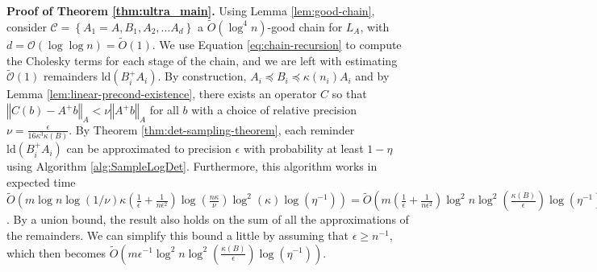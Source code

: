 \textbf{Proof of Theorem \ref{thm:ultra_main}.} Using Lemma \ref{lem:good-chain},
consider $\mathcal{C}=\left\{ A_{1}=A,B_{1},A_{2},\dots A_{d}\right\} $
a $\tilde{O}\left(\log^{4}n\right)$-good chain for $L_{A}$, with
$d=\mathcal{O}\left(\log\log n\right)=\tilde{O}\left(1\right)$. We
use Equation \ref{eq:chain-recursion} to compute the Cholesky terms
for each stage of the chain, and we are left with estimating $\tilde{\mathcal{O}}\left(1\right)$
remainders $\text{ld}\left(B_{i}^{+}A_{i}\right)$. By construction,
$A_{i}\preceq B_{i}\preceq\kappa\left(n_{i}\right)A_{i}$ and by Lemma
\ref{lem:linear-precond-existence}, there exists an operator $C$
so that $\left\Vert C\left(b\right)-A^{+}b\right\Vert _{A}<\nu\left\Vert A^{+}b\right\Vert _{A}$
for all $b$ with a choice of relative precision $\nu=\frac{\epsilon}{16\kappa^{3}\kappa\left(B\right)}$.
By Theorem \ref{thm:det-sampling-theorem}, each reminder $\text{ld}\left(B_{i}^{+}A_{i}\right)$
can be approximated to precision $\epsilon$ with probability at least
$1-\eta$ using Algorithm \ref{alg:SampleLogDet}. Furthermore, this
algorithm works in expected time $\tilde{O}\left(m\log n\log\left(1/\nu\right)\kappa\left(\frac{1}{\epsilon}+\frac{1}{n\epsilon^{2}}\right)\log\left(\frac{n\kappa}{\nu}\right)\log^{2}\left(\kappa\right)\log\left(\eta^{-1}\right)\right)=\tilde{O}\left(m\left(\frac{1}{\epsilon}+\frac{1}{n\epsilon^{2}}\right)\log^{2}n\log^{2}\left(\frac{\kappa\left(B\right)}{\epsilon}\right)\log\left(\eta^{-1}\right)\right)$.
By a union bound, the result also holds on the sum of all the approximations
of the remainders. We can simplify this bound a little by assuming
that $\epsilon\geq n^{-1}$, which then becomes $\tilde{O}\left(m\epsilon^{-1}\log^{2}n\log^{2}\left(\frac{\kappa\left(B\right)}{\epsilon}\right)\log\left(\eta^{-1}\right)\right)$. 
